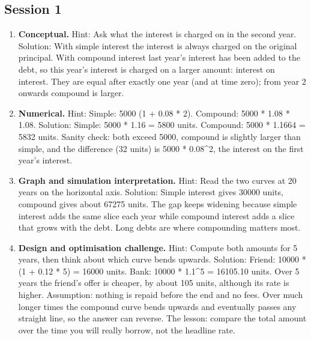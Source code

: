 \documentclass[11pt,a4paper]{article}
\begin{document}
\subsection*{Session 1}
\begin{enumerate}[nosep]
\item \textbf{Conceptual.} Hint: Ask what the interest is charged on in the second year. Solution: With simple interest the interest is always charged on the original principal. With compound interest last year's interest has been added to the debt, so this year's interest is charged on a larger amount: interest on interest. They are equal after exactly one year (and at time zero); from year 2 onwards compound is larger.
\item \textbf{Numerical.} Hint: Simple: 5000 (1 + 0.08 * 2). Compound: 5000 * 1.08 * 1.08. Solution: Simple: 5000 * 1.16 = 5800 units. Compound: 5000 * 1.1664 = 5832 units. Sanity check: both exceed 5000, compound is slightly larger than simple, and the difference (32 units) is 5000 * 0.08\textasciicircum{}2, the interest on the first year's interest.
\item \textbf{Graph and simulation interpretation.} Hint: Read the two curves at 20 years on the horizontal axis. Solution: Simple interest gives 30000 units, compound gives about 67275 units. The gap keeps widening because simple interest adds the same slice each year while compound interest adds a slice that grows with the debt. Long debts are where compounding matters most.
\item \textbf{Design and optimisation challenge.} Hint: Compute both amounts for 5 years, then think about which curve bends upwards. Solution: Friend: 10000 * (1 + 0.12 * 5) = 16000 units. Bank: 10000 * 1.1\textasciicircum{}5 = 16105.10 units. Over 5 years the friend's offer is cheaper, by about 105 units, although its rate is higher. Assumption: nothing is repaid before the end and no fees. Over much longer times the compound curve bends upwards and eventually passes any straight line, so the answer can reverse. The lesson: compare the total amount over the time you will really borrow, not the headline rate.
\end{enumerate}
\end{document}
